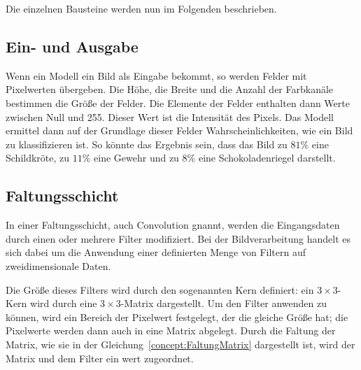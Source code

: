 Die einzelnen Bausteine werden nun im Folgenden beschrieben.



\subsection{Ein- und Ausgabe}

Wenn ein Modell ein Bild als Eingabe bekommt, so werden Felder mit Pixelwerten übergeben. Die Höhe, die Breite und die Anzahl der Farbkanäle bestimmen die Größe der Felder. Die Elemente der Felder enthalten dann Werte zwischen Null und 255. Dieser Wert ist die Intensität des Pixels. Das Modell ermittel dann auf der Grundlage dieser Felder Wahrscheinlichkeiten, wie ein Bild zu klassifizieren ist. So könnte das Ergebnis sein, dass das Bild zu $81\%$ eine Schildkröte, zu $11\%$ eine Gewehr und zu $8\%$ eine Schokoladenriegel darstellt.





\subsection{Faltungsschicht}\label{subsec:conv2d}

In einer Faltungsschicht, auch Convolution gnannt, werden die Eingangsdaten durch einen oder mehrere Filter modifiziert. Bei der Bildverarbeitung handelt es sich dabei um die Anwendung einer definierten Menge von Filtern auf zweidimensionale Daten.

Die Größe dieses Filters wird durch den sogenannten Kern definiert: ein $3 \times 3$-Kern wird durch eine $3 \times 3$-Matrix dargestellt. Um den Filter anwenden zu können, wird ein Bereich der Pixelwert festgelegt, der die gleiche Größe hat; die Pixelwerte werden dann auch in eine Matrix abgelegt. Durch die Faltung der Matrix, wie sie in der Gleichung~\ref{concept:FaltungMatrix} dargestellt ist, wird der Matrix und dem Filter ein wert zugeordnet. 
    
